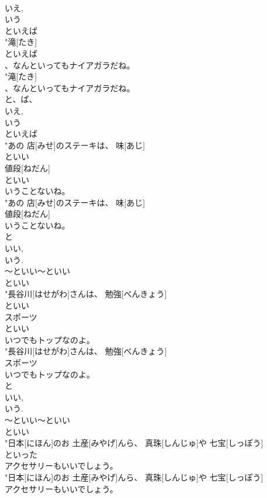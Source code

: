 \documentclass[8pt]{extreport}
\begin{document}
\begin{CJK}{UTF8}{min}
\\	いえ, 
\\	いう	
\\	といえば
\\	"滝[たき]
\\	といえば
\\	、なんといってもナイアガラだね。
\\	"滝[たき]
\\	、なんといってもナイアガラだね。
\\	と、ば、
\\	いえ, 
\\	いう	
\\	といえば
\\	"あの 店[みせ]のステーキは、 味[あじ]
\\	といい
\\	値段[ねだん]
\\	といい
\\	いうことないね。
\\	"あの 店[みせ]のステーキは、 味[あじ]
\\	値段[ねだん]
\\	いうことないね。
\\	と 
\\	いい, 
\\	いう. 
\\	～といい～といい	
\\	といい
\\	"長谷川[はせがわ]さんは、 勉強[べんきょう]
\\	といい
\\	スポーツ
\\	といい
\\	いつでもトップなのよ。
\\	"長谷川[はせがわ]さんは、 勉強[べんきょう]
\\	スポーツ
\\	いつでもトップなのよ。
\\	と 
\\	いい, 
\\	いう. 
\\	～といい～といい	
\\	といい
\\	"日本[にほん]のお 土産[みやげ]んら、 真珠[しんじゅ]や 七宝[しっぽう]
\\	といった
\\	アクセサリーもいいでしょう。
\\	"日本[にほん]のお 土産[みやげ]んら、 真珠[しんじゅ]や 七宝[しっぽう]
\\	アクセサリーもいいでしょう。

\end{CJK}
\end{document}
